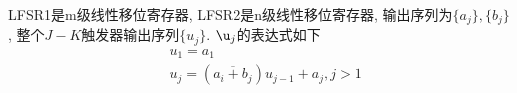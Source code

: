 \documentclass[UTF8]{ctexart}
\begin{document}
LFSR1是m级线性移位寄存器, LFSR2是n级线性移位寄存器, 输出序列为$\{a_j\}, \{b_j\}$, 整个$J-K$触发器输出序列$\{u_j\}$.
$\u_j$的表达式如下
$$
\begin{aligned}
    &u_1=a_1\\
    &u_j=(\overline{a_i+b_j})u_{j-1}+a_j, j>1\\
\end{aligned}
$$
\end{document}

